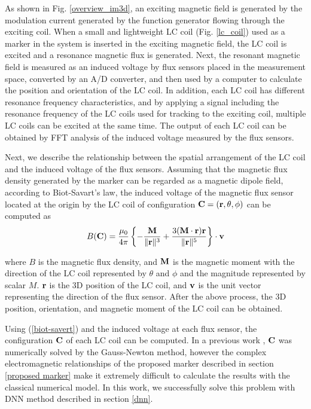 \documentclass[journal,twoside,web]{ieeecolor}
\begin{document}
As shown in Fig. \ref{overview_im3d}, an exciting magnetic field is generated by the modulation current generated by the function generator flowing through the exciting coil. When a small and lightweight LC coil (Fig. \ref{lc_coil}) used as a marker in the system is inserted in the exciting magnetic field, the LC coil is excited and a resonance magnetic flux is generated. Next, the resonant magnetic field is measured as an induced voltage by flux sensors placed in the measurement space, converted by an A/D converter, and then used by a computer to calculate the position and orientation of the LC coil. In addition, each LC coil has different resonance frequency characteristics, and by applying a signal including the resonance frequency of the LC coils used for tracking to the exciting coil, multiple LC coils can be excited at the same time. The output of each LC coil can be obtained by FFT analysis of the induced voltage measured by the flux sensors.

Next, we describe the relationship between the spatial arrangement of the LC coil and the induced voltage of the flux sensors. Assuming that the magnetic flux density generated by the marker can be regarded as a magnetic dipole field, according to Biot-Savart's law, the induced voltage of the magnetic flux sensor located at the origin by the LC coil of configuration ${\bf C}=({\bf r}, \theta, \phi)$ can be computed as
\begin{equation}
  B({\bf C}) =  \frac{\mu_{0}}{4\pi} \left\{
  -\frac{{\bf M}}{\|{\bf r}\|^{3}}
  +\frac{3({\bf M} \cdot {\bf r}){\bf r}}{\|{\bf r}\|^{5}}
  \right\}\cdot \bf v
  \label{biot-savert}
\end{equation}

where $B$ is the magnetic flux density, and ${\bf M}$ is the magnetic moment with the direction of the LC coil represented by $\theta$ and $\phi$ and the magnitude represented by scalar ${M}$. ${\bf r}$ is the 3D position of the LC coil, and ${\bf v}$ is the unit vector representing the direction of the flux sensor. After the above process, the 3D position, orientation, and magnetic moment of the LC coil can be obtained.

Using (\ref{biot-savert}) and the induced voltage at each flux sensor, the configuration ${\bf C}$ of each LC coil can be computed. In a previous work \cite{im3d, im6d, yabukami1, hashi1}, ${\bf C}$ was numerically solved by the Gauss-Newton method, however the complex electromagnetic relationships of the proposed marker described in section \ref{proposed marker} make it extremely difficult to calculate the results with the classical numerical model. In this work, we successfully solve this problem with DNN method described in section \ref{dnn}.
\end{document}
